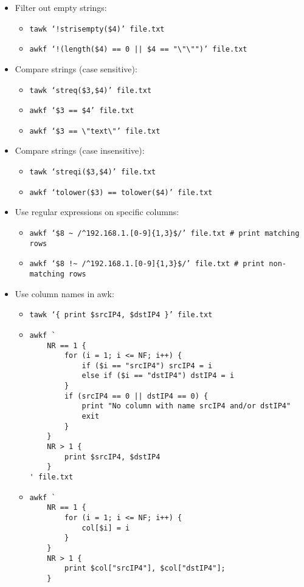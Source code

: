 \documentclass[documentation]{subfiles}
\begin{document}
\begin{itemize}
    \item Filter out empty strings:
        \begin{itemize}
            \item {\tt tawk `!strisempty(\$4)' file.txt}
            \item {\tt awkf `!(length(\$4) == 0 || \$4 == "\textbackslash{}"\textbackslash{}"")' file.txt}
        \end{itemize}

    \item Compare strings (case sensitive):
        \begin{itemize}
            \item {\tt tawk `streq(\$3,\$4)' file.txt}
            \item {\tt awkf `\$3 == \$4' file.txt}
            \item {\tt awkf `\$3 == \textbackslash{}"text\textbackslash{}"' file.txt}
        \end{itemize}

    \item Compare strings (case insensitive):
        \begin{itemize}
            \item {\tt tawk `streqi(\$3,\$4)' file.txt}
            \item {\tt awkf `tolower(\$3) == tolower(\$4)' file.txt}
        \end{itemize}

    \item Use regular expressions on specific columns:
        \begin{itemize}
            \item {\tt awkf `\$8 \textasciitilde{} /\textasciicircum{}192.168.1.[0-9]\{1,3\}\$/' file.txt  \# print matching rows}
            \item {\tt awkf `\$8 !\textasciitilde{} /\textasciicircum{}192.168.1.[0-9]\{1,3\}\$/' file.txt \# print non-matching rows}
        \end{itemize}

    \item Use column names in awk:
        \begin{itemize}
            \item {\tt tawk `\{ print \$srcIP4, \$dstIP4 \}' file.txt}
            \item \begin{verbatim}
awkf `
    NR == 1 {
        for (i = 1; i <= NF; i++) {
            if ($i == "srcIP4") srcIP4 = i
            else if ($i == "dstIP4") dstIP4 = i
        }
        if (srcIP4 == 0 || dstIP4 == 0) {
            print "No column with name srcIP4 and/or dstIP4"
            exit
        }
    }
    NR > 1 {
        print $srcIP4, $dstIP4
    }
' file.txt
\end{verbatim}
            \item \begin{verbatim}
awkf `
    NR == 1 {
        for (i = 1; i <= NF; i++) {
            col[$i] = i
        }
    }
    NR > 1 {
        print $col["srcIP4"], $col["dstIP4"];
    }


\end{verbatim}
\end{itemize}
\end{itemize}
\end{document}
